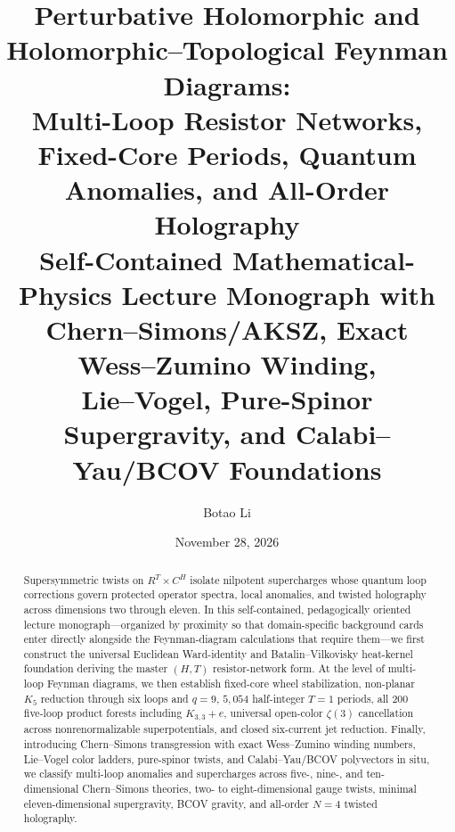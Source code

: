\documentclass[11pt,a4paper]{article}
\title{\vspace{-1.2em}\textbf{Perturbative Holomorphic and Holomorphic--Topological Feynman Diagrams:\\
Multi-Loop Resistor Networks, Fixed-Core Periods, Quantum Anomalies, and All-Order Holography}\\[6pt]
{\large Self-Contained Mathematical-Physics Lecture Monograph with Chern--Simons/AKSZ, Exact Wess--Zumino Winding,\\
Lie--Vogel, Pure-Spinor Supergravity, and Calabi--Yau/BCOV Foundations}}
\author{Botao Li}
\date{November 28, 2026}
\theoremstyle{plain}
\theoremstyle{definition}
\theoremstyle{remark}
\numberwithin{equation}{section}
\numberwithin{figure}{section}
\numberwithin{table}{section}
\newcommand{\RR}{\mathbb{R}}
\newcommand{\C}{\mathbb{C}}
\def\mathcal#1{#1}%
\def\mathbb#1{#1}%
\begin{document}
\maketitle
\thispagestyle{empty}

\begin{abstract}
\noindent
Supersymmetric twists on $\RR^T \times \C^H$ isolate nilpotent supercharges whose quantum loop corrections govern protected operator spectra, local anomalies, and twisted holography across dimensions two through eleven. In this self-contained, pedagogically oriented lecture monograph---organized by proximity so that domain-specific background cards enter directly alongside the Feynman-diagram calculations that require them---we first construct the universal Euclidean Ward-identity and Batalin--Vilkovisky heat-kernel foundation deriving the master $(H,T)$ resistor-network form. At the level of multi-loop Feynman diagrams, we then establish fixed-core wheel stabilization, non-planar $K_5$ reduction through six loops and $q=9$, $5{,}054$ half-integer $T=1$ periods, all $200$ five-loop product forests including $K_{3,3}+e$, universal open-color $\zeta(3)$ cancellation across nonrenormalizable superpotentials, and closed six-current jet reduction. Finally, introducing Chern--Simons transgression with exact Wess--Zumino winding numbers, Lie--Vogel color ladders, pure-spinor twists, and Calabi--Yau/BCOV polyvectors in situ, we classify multi-loop anomalies and supercharges across five-, nine-, and ten-dimensional Chern--Simons theories, two- to eight-dimensional gauge twists, minimal eleven-dimensional supergravity, BCOV gravity, and all-order $\mathcal{N}=4$ twisted holography.
\end{abstract}

\newpage
{\small\setcounter{tocdepth}{2}\tableofcontents}
\newpage










\appendix


\end{document}
